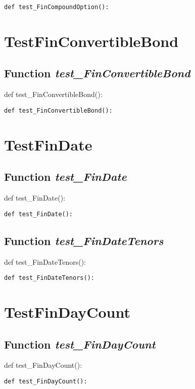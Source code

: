 \documentclass[twoside,11pt]{book}
\begin{document}
\begin{lstlisting}
def test_FinCompoundOption():
\end{lstlisting}


\newpage
\section{TestFinConvertibleBond}

\subsection{Function {\it test\_FinConvertibleBond}}
def test\_FinConvertibleBond():

\begin{lstlisting}
def test_FinConvertibleBond():
\end{lstlisting}


\newpage
\section{TestFinDate}

\subsection{Function {\it test\_FinDate}}
def test\_FinDate():

\begin{lstlisting}
def test_FinDate():
\end{lstlisting}

\subsection{Function {\it test\_FinDateTenors}}
def test\_FinDateTenors():

\begin{lstlisting}
def test_FinDateTenors():
\end{lstlisting}


\newpage
\section{TestFinDayCount}

\subsection{Function {\it test\_FinDayCount}}
def test\_FinDayCount():

\begin{lstlisting}
def test_FinDayCount():
\end{lstlisting}
\end{document}
